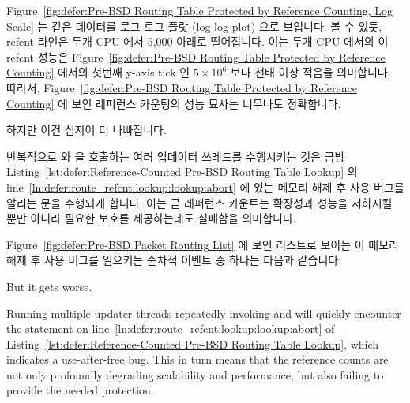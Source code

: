{{	Figure~\ref{fig:defer:Pre-BSD Routing Table Protected by Reference Counting, Log Scale}
	는 같은 데이터를 로그-로그 플랏 (log-log plot) 으로 보입니다.
	볼 수 있듯, refcnt 라인은 두개 CPU 에서 5,000 아래로 떨어집니다.
	이는 두개 CPU 에서의 이 refcnt 성능은
	Figure~\ref{fig:defer:Pre-BSD Routing Table Protected by Reference Counting}
	에서의 첫번째 y-axis tick 인 $5 \times 10^6$ 보다 천배 이상 적음을
	의미합니다.
	따라서,
	Figure~\ref{fig:defer:Pre-BSD Routing Table Protected by Reference Counting}
	에 보인 레퍼런스 카운팅의 성능 묘사는 너무나도 정확합니다.

}\QuickQuizEndE
}

하지만 이건 심지어 더 나빠집니다.

반복적으로  와  을 호출하는 여러 업데이터
쓰레드를 수행시키는 것은 금방
Listing~\ref{lst:defer:Reference-Counted Pre-BSD Routing Table Lookup} 의
line~\ref{ln:defer:route_refcnt:lookup:lookup:abort}  에 있는 메모리 해제 후
사용 버그를 알리는  문을 수행되게 합니다.
이는 곧 레퍼런스 카운트는 확장성과 성능을 저하시킬 뿐만 아니라 필요한 보호를
제공하는데도 실패함을 의미합니다.

Figure~\ref{fig:defer:Pre-BSD Packet Routing List} 에 보인 리스트로 보이는 이
메모리 해제 후 사용 버그를 일으키는 순차적 이벤트 중 하나는 다음과 같습니다:

\iffalse

But it gets worse.

Running multiple updater threads repeatedly invoking
 and  will quickly encounter the
 statement on
line~\ref{ln:defer:route_refcnt:lookup:lookup:abort} of
Listing~\ref{lst:defer:Reference-Counted Pre-BSD Routing Table Lookup},
which indicates a use-after-free bug.
This in turn means that the reference counts are not only profoundly
degrading scalability and performance, but also failing to provide
the needed protection.

